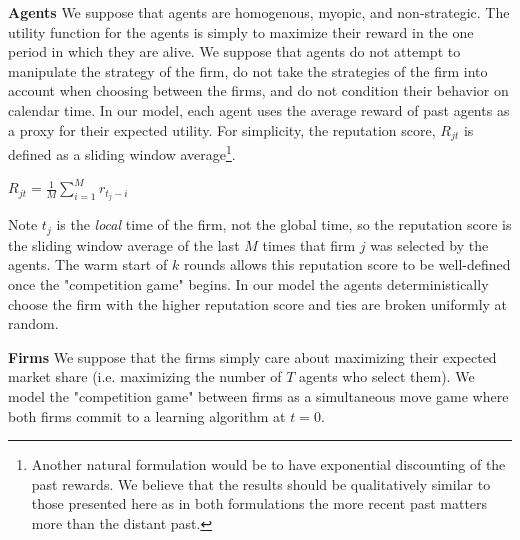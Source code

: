 \documentclass[letterpaper]{article}
\theoremstyle{definition}
\begin{document}
\noindent \textbf{Agents} We suppose that agents are homogenous, myopic, and non-strategic. The utility function for the agents is simply to maximize their reward in the one period in which they are alive. We suppose that agents do not attempt to manipulate the strategy of the firm, do not take the strategies of the firm into account when choosing between the firms, and do not condition their behavior on calendar time. In our model, each agent uses the average reward of past agents as a proxy for their expected utility. For simplicity, the reputation score, $R_{jt}$ is defined as a sliding window average\footnote{Another natural formulation would be to have exponential discounting of the past rewards. We believe that the results should be qualitatively similar to those presented here as in both formulations the more recent past matters more than the distant past.}.
\begin{center}
$R_{jt} = \frac{1}{M} \sum\limits_{i=1}^{M} r_{t_j-i}$
\end{center}

Note $t_j$ is the \textit{local} time of the firm, not the global time, so the reputation score is the sliding window average of the last $M$ times that firm $j$ was selected by the agents. The warm start of $k$ rounds allows this reputation score to be well-defined once the "competition game" begins. In our model the agents deterministically choose the firm with the higher reputation score and ties are broken uniformly at random.

\noindent \textbf{Firms} We suppose that the firms simply care about maximizing their expected market share (i.e. maximizing the number of $T$ agents who select them). We model the "competition game" between firms as a simultaneous move game where both firms commit to a learning algorithm at $t = 0$.
\end{document}
